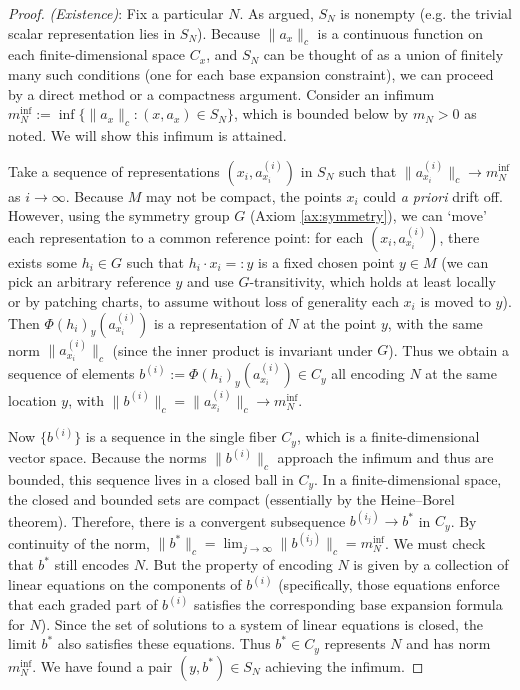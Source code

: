 \documentclass[11pt]{article}
\begin{document}
\begin{proof}
\emph{(Existence)}: Fix a particular $N$. As argued, $S_N$ is nonempty (e.g. the trivial scalar representation lies in $S_N$). Because $\|a_x\|_c$ is a continuous function on each finite-dimensional space $C_x$, and $S_N$ can be thought of as a union of finitely many such conditions (one for each base expansion constraint), we can proceed by a direct method or a compactness argument. Consider an infimum $m_N^{\inf} := \inf\{\|a_x\|_c : (x,a_x)\in S_N\}$, which is bounded below by $m_N > 0$ as noted. We will show this infimum is attained.

Take a sequence of representations $(x_i, a^{(i)}_{x_i})$ in $S_N$ such that $\|a^{(i)}_{x_i}\|_c \to m_N^{\inf}$ as $i\to\infty$. Because $M$ may not be compact, the points $x_i$ could \emph{a priori} drift off. However, using the symmetry group $G$ (Axiom \ref{ax:symmetry}), we can `move' each representation to a common reference point: for each $(x_i, a^{(i)}_{x_i})$, there exists some $h_i \in G$ such that $h_i \cdot x_i =: y$ is a fixed chosen point $y \in M$ (we can pick an arbitrary reference $y$ and use $G$-transitivity, which holds at least locally or by patching charts, to assume without loss of generality each $x_i$ is moved to $y$). Then $\Phi(h_i)_y(a^{(i)}_{x_i})$ is a representation of $N$ at the point $y$, with the same norm $\|a^{(i)}_{x_i}\|_c$ (since the inner product is invariant under $G$). Thus we obtain a sequence of elements $b^{(i)} := \Phi(h_i)_y(a^{(i)}_{x_i}) \in C_y$ all encoding $N$ at the same location $y$, with $\|b^{(i)}\|_c = \|a^{(i)}_{x_i}\|_c \to m_N^{\inf}$.

Now $\{b^{(i)}\}$ is a sequence in the single fiber $C_y$, which is a finite-dimensional vector space. Because the norms $\|b^{(i)}\|_c$ approach the infimum and thus are bounded, this sequence lives in a closed ball in $C_y$. In a finite-dimensional space, the closed and bounded sets are compact (essentially by the Heine–Borel theorem). Therefore, there is a convergent subsequence $b^{(i_j)} \to b^*$ in $C_y$. By continuity of the norm, $\|b^*\|_c = \lim_{j\to\infty}\|b^{(i_j)}\|_c = m_N^{\inf}$. We must check that $b^*$ still encodes $N$. But the property of encoding $N$ is given by a collection of linear equations on the components of $b^{(i)}$ (specifically, those equations enforce that each graded part of $b^{(i)}$ satisfies the corresponding base expansion formula for $N$). Since the set of solutions to a system of linear equations is closed, the limit $b^*$ also satisfies these equations. Thus $b^* \in C_y$ represents $N$ and has norm $m_N^{\inf}$. We have found a pair $(y, b^*) \in S_N$ achieving the infimum.


\end{proof}
\end{document}
